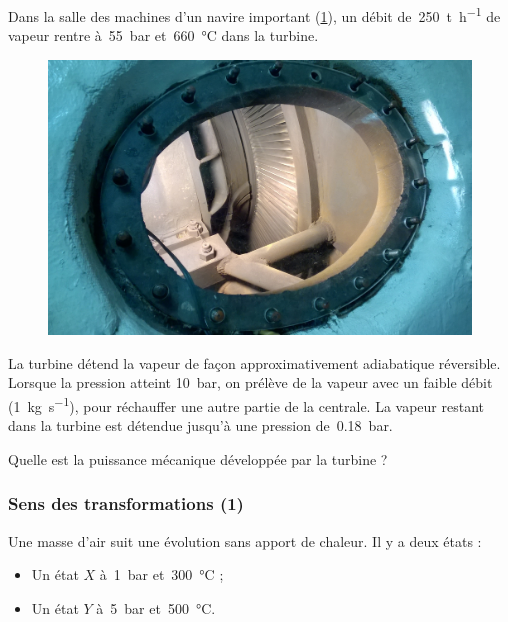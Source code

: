 	Dans la salle des machines d’un navire important (\cref{fig_turbine_uss_hornet}), un débit de~\SI{250}{\tonne\per\hour} de vapeur rentre à~\SI{55}{\bar} et~\SI{660}{\degreeCelsius} dans la turbine.
	
	\begin{figure}[htp] %
		\begin{center}
		\includegraphics[width=\columnwidth]{images/turbine_uss_hornet.jpg}
		\end{center}
		\label{fig_turbine_uss_hornet}
	\end{figure}
	
	La turbine détend la vapeur de façon approximativement adiabatique réversible. Lorsque la pression atteint \SI{10}{\bar}, on prélève de la vapeur avec un faible débit (\SI{1}{\kilogram\per\second}), pour réchauffer une autre partie de la centrale. La vapeur restant dans la turbine est détendue jusqu’à une pression de~\SI{0,18}{\bar}.
	
	Quelle est la puissance mécanique développée par la turbine ?

\subsubsection{Sens des transformations (1)}
\label{exo_sens_transfos_un}

	Une masse d’air suit une évolution sans apport de chaleur. Il y a deux états :
		\begin{itemize}
			\item Un état $X$ à~\SI{1}{\bar} et~\SI{300}{\degreeCelsius} ;
			\item Un état $Y$ à~\SI{5}{\bar} et~\SI{500}{\degreeCelsius}.
		\end{itemize}
		

